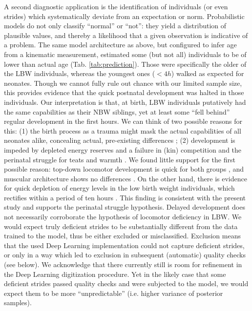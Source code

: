 \bigskip
A second diagnostic application is the identification of individuals (or even strides) which systematically deviate from an expectation or norm.
Probabilistic models do not only classify ``normal'' or ``not'': they yield a distribution of plausible values, and thereby a likelihood that a given observation is indicative of a problem.
The same model architecture as above, but configured to infer age from a kinematic measurement, estimated some (but not all) individuals to be of lower than actual age (Tab. \ref{tab:prediction}).
Those were specifically the older of the LBW individuals, whereas the youngest ones (\(<4h\)) walked as expected for neonates.
Though we cannot fully rule out chance with our limited sample size, this provides evidence that the quick postnatal development was halted in those individuals.
Our interpretation is that, at birth, LBW individuals putatively had the same capabilities as their NBW siblings, yet at least some ``fell behind'' regular development in the first hours.
We can think of two possible reasons for this: (1) the birth process as a trauma might mask the actual capabilities of all neonates alike, concealing actual, pre-existing differences \citep{Litten2003}; (2) development is impeded by depleted energy reserves and a failure in (kin) competition and the perinatal struggle for teats and warmth \citep{LeDividich2017}.
We found little support for the first possible reason: top-down locomotor development is quick for both groups \citep{VandenHole2017,VandenHole2018}, and muscular architecture shows no differences \citep{VandenHole2018b}.
On the other hand, there is evidence for quick depletion of energy levels in the low birth weight individuals, which rectifies within a period of ten hours \citep{VandenHole2019}.
This finding is consistent with the present study and supports the perinatal struggle hypothesis.
Delayed development does not necessarily corroborate the hypothesis of locomotor deficiency in LBW.
We would expect truly deficient strides to be substantially different from the data trained to the model, thus be either excluded or misclassified.
Exclusion means that the used Deep Learning implementation could not capture deficient strides, or only in a way which led to exclusion in subsequent (automatic) quality checks (see below).
We acknowledge that there currently still is room for refinement in the Deep Learning digitization procedure.
Yet in the likely case that some deficient strides passed quality checks and were subjected to the model, we would expect them to be more ``unpredictable'' (i.e. higher variance of posterior samples).
